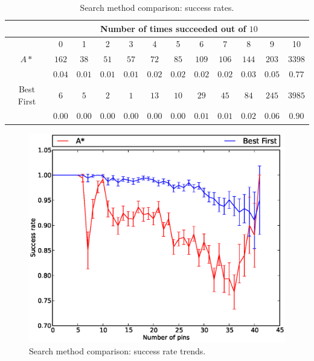 \begin{table}[H]
\begin{center}
\begin{singlespace}
\begin{tabular}{|c||c|c|c|c|c|c|c|c|c|c|c|}
\hline
 & \multicolumn{11}{|c|}{Number of times succeeded out of $10$} \\
\hline
 & 0 & 1 & 2 & 3 & 4 & 5 & 6 & 7 & 8 & 9 & 10 \\
\hline\hline
$A*$ & $162$ & $38$ & $51$ & $57$ & $72$ & $85$ & $109$ & $106$ & $144$ & $203$ & $3398$ \\
 & $0.04$ & $0.01$ & $0.01$ & $0.01$ & $0.02$ & $0.02$ & $0.02$ & $0.02$ & $0.03$ & $0.05$ & $0.77$ \\
\hline
 Best First & $6$ & $5$ & $2$ & $1$ & $13$ & $10$ & $29$ & $45$ & $84$ & $245$ & $3985$ \\
  & $0.00$ & $0.00$ & $0.00$ & $0.00$ & $0.00$ & $0.00$ & $0.01$ & $0.01$ & $0.02$ & $0.06$ & $0.90$ \\
\hline
\end{tabular}
\end{singlespace}
\end{center}
\label{tb:search_success}
\caption{Search method comparison: success rates.}
\end{table}

\begin{figure}[H]
\begin{center}
\includegraphics[width=\textwidth]{Images/search_success_trend_comparison.eps}
\caption{Search method comparison: success rate trends.}
\label{fig:search_success_trend}
\end{center}
\end{figure}

